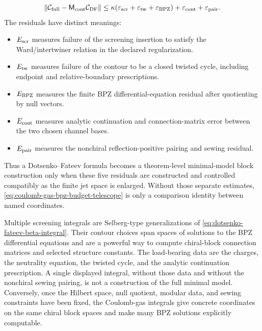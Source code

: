 \begin{equation}
  \|\mathcal C_{\rm full}-\mathsf M_{\rm cont}\mathcal C_{\rm DF}\|
  \leq
  \kappa(\varepsilon_{\rm scr}+\varepsilon_{\rm tw}
  +\varepsilon_{\rm BPZ})
  +\varepsilon_{\rm cont}+\varepsilon_{\rm pair}.
  \label{eq:coulomb-gas-bpz-budget-bound}
\end{equation}
The residuals have distinct meanings:
\begin{itemize}
\item \(E_{\rm scr}\) measures failure of the screening insertion to satisfy the
Ward/intertwiner relation in the declared regularization.
\item \(E_{\rm tw}\) measures failure of the contour to be a closed twisted
cycle, including endpoint and relative-boundary prescriptions.
\item \(E_{\rm BPZ}\) measures the finite BPZ differential-equation residual
after quotienting by null vectors.
\item \(E_{\rm cont}\) measures analytic continuation and connection-matrix
error between the two chosen channel bases.
\item \(E_{\rm pair}\) measures the nonchiral reflection-positive pairing and
sewing residual.
\end{itemize}
Thus a Dotsenko--Fateev formula becomes a theorem-level minimal-model block
construction only when these five residuals are constructed and controlled
compatibly as the finite jet space is enlarged.  Without those separate
estimates, \eqref{eq:coulomb-gas-bpz-budget-telescope} is only a comparison
identity between named coordinates.

\begin{remark}
\label{rem:dotsenko-fateev-status}
Multiple screening integrals are Selberg-type generalizations of
\eqref{eq:dotsenko-fateev-beta-integral}.  Their contour choices span spaces
of solutions to the BPZ differential equations and are a powerful way to
compute chiral-block connection matrices and selected structure constants.
The load-bearing data are the charges, the neutrality equation, the twisted
cycle, and the analytic continuation prescription.  A single displayed
integral, without those data and without the nonchiral sewing pairing, is not
a construction of the full minimal model.  Conversely, once the Hilbert space,
null quotient, modular data, and sewing constraints have been fixed, the
Coulomb-gas integrals give concrete coordinates on the same chiral block
spaces and make many BPZ solutions explicitly computable.
\end{remark}

